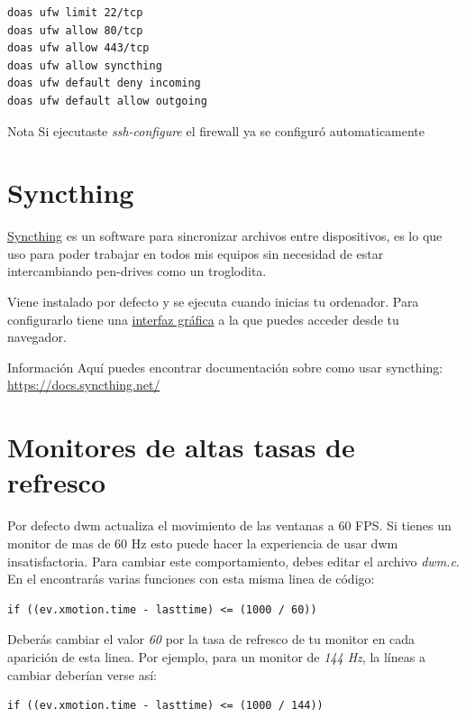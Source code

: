 \documentclass[12pt]{article}
\begin{document}
\begin{verbatim}
doas ufw limit 22/tcp
doas ufw allow 80/tcp
doas ufw allow 443/tcp
doas ufw allow syncthing
doas ufw default deny incoming
doas ufw default allow outgoing
\end{verbatim}

\begin{mybox}{Nota}
Si ejecutaste \emph{ssh-configure} el firewall ya se configuró automaticamente
\end{mybox}

\section{Syncthing}

\href{https://github.com/syncthing/syncthing}{Syncthing} es un software para sincronizar archivos entre dispositivos, es lo que uso para poder trabajar en todos mis equipos sin necesidad de estar intercambiando pen-drives como un troglodita.

Viene instalado por defecto y se ejecuta cuando inicias tu ordenador. Para configurarlo tiene una \href{http://localhost:8384/}{interfaz gráfica} a la que puedes acceder desde tu navegador.

\begin{mybox}{Información}
Aquí puedes encontrar documentación sobre como usar syncthing: \href{https://docs.syncthing.net/}{https://docs.syncthing.net/}
\end{mybox}

\section{Monitores de altas tasas de refresco}

Por defecto dwm actualiza el movimiento de las ventanas a 60 FPS. Si tienes un monitor de mas de 60 Hz esto puede hacer la experiencia de usar dwm insatisfactoria. Para cambiar este comportamiento, debes editar el archivo \emph{dwm.c}. En el encontrarás varias funciones con esta misma linea de código:

\begin{verbatim}
if ((ev.xmotion.time - lasttime) <= (1000 / 60))
\end{verbatim}

Deberás cambiar el valor \emph{60} por la tasa de refresco de tu monitor en cada aparición de esta linea. Por ejemplo, para un monitor de \emph{144 Hz}, la líneas a cambiar deberían verse así:

\begin{verbatim}
if ((ev.xmotion.time - lasttime) <= (1000 / 144))
\end{verbatim}
\end{document}
